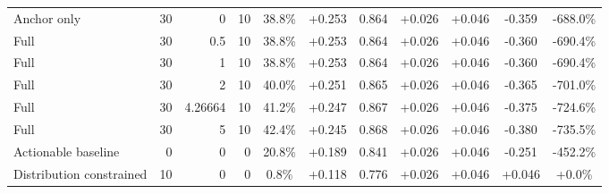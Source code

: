 \begin{table}[htbp]
\begin{tabular}{lrrrccccccc}
Anchor only & 30 & 0 & 10 & 38.8\% & +0.253 & 0.864 & +0.026 & +0.046 & -0.359 & -688.0\% \\
Full & 30 & 0.5 & 10 & 38.8\% & +0.253 & 0.864 & +0.026 & +0.046 & -0.360 & -690.4\% \\
Full & 30 & 1 & 10 & 38.8\% & +0.253 & 0.864 & +0.026 & +0.046 & -0.360 & -690.4\% \\
Full & 30 & 2 & 10 & 40.0\% & +0.251 & 0.865 & +0.026 & +0.046 & -0.365 & -701.0\% \\
Full & 30 & 4.26664 & 10 & 41.2\% & +0.247 & 0.867 & +0.026 & +0.046 & -0.375 & -724.6\% \\
Full & 30 & 5 & 10 & 42.4\% & +0.245 & 0.868 & +0.026 & +0.046 & -0.380 & -735.5\% \\
Actionable baseline & 0 & 0 & 0 & 20.8\% & +0.189 & 0.841 & +0.026 & +0.046 & -0.251 & -452.2\% \\
Distribution constrained & 10 & 0 & 0 & 0.8\% & +0.118 & 0.776 & +0.026 & +0.046 & +0.046 & +0.0\% \\
\bottomrule
\end{tabular}
\end{table}